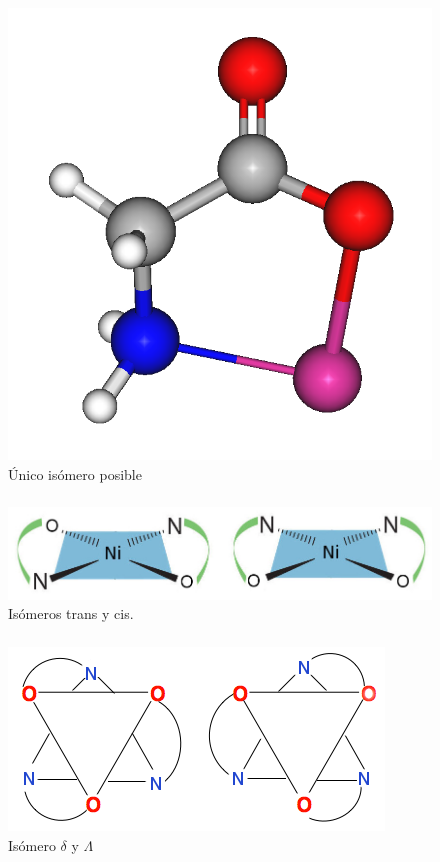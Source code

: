 \documentclass[fleqn,10pt]{SelfArx} %
\begin{document}
	\subsubsection{\ce{[Ni(Gly^-)]^+}}
	\begin{figure}[h]
		\centering
		\includegraphics[width = 0.4\linewidth]{images/Single.png}
		\caption{\'Unico is\'omero posible}
	\end{figure}
	
	\subsubsection{\ce{[Ni(Gly^-)_2]}}
	\begin{figure}[h]
		\centering
		\includegraphics[width = \linewidth]{images/cis_trans.jpg}
		\caption{Is\'omeros trans y cis.}
	\end{figure}
	
	\pagebreak
	\subsubsection{\ce{[Ni(Gly^-)_3]^-}}
	\begin{figure}[h!]
		\centering
		\includegraphics[width = 0.7\linewidth]{images/delta_lambda.png}
		\caption{Is\'omero $\delta$ y $\Lambda$}
	\end{figure}
	
\end{document}
